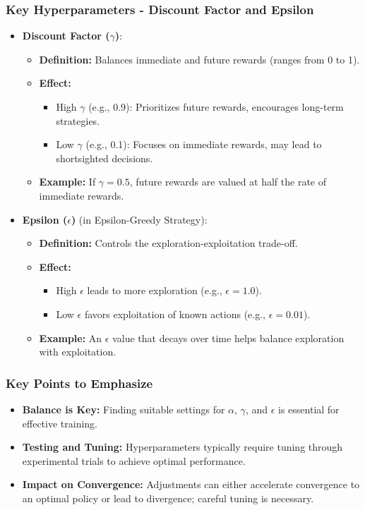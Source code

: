 \documentclass{beamer}
\begin{document}
\begin{frame}[fragile]
    \frametitle{Key Hyperparameters - Discount Factor and Epsilon}
    \begin{itemize}
        \item \textbf{Discount Factor ($\gamma$)}:
        \begin{itemize}
            \item \textbf{Definition:} Balances immediate and future rewards (ranges from 0 to 1).
            \item \textbf{Effect:}
                \begin{itemize}
                    \item High $\gamma$ (e.g., 0.9): Prioritizes future rewards, encourages long-term strategies.
                    \item Low $\gamma$ (e.g., 0.1): Focuses on immediate rewards, may lead to shortsighted decisions.
                \end{itemize}
            \item \textbf{Example:} If $\gamma = 0.5$, future rewards are valued at half the rate of immediate rewards.
        \end{itemize}

        \item \textbf{Epsilon ($\epsilon$)} (in Epsilon-Greedy Strategy):
        \begin{itemize}
            \item \textbf{Definition:} Controls the exploration-exploitation trade-off.
            \item \textbf{Effect:}
                \begin{itemize}
                    \item High $\epsilon$ leads to more exploration (e.g., $\epsilon = 1.0$).
                    \item Low $\epsilon$ favors exploitation of known actions (e.g., $\epsilon = 0.01$).
                \end{itemize}
            \item \textbf{Example:} An $\epsilon$ value that decays over time helps balance exploration with exploitation.
        \end{itemize}
    \end{itemize}
\end{frame}

\begin{frame}[fragile]
    \frametitle{Key Points to Emphasize}
    \begin{itemize}
        \item \textbf{Balance is Key:} Finding suitable settings for $\alpha$, $\gamma$, and $\epsilon$ is essential for effective training.
        \item \textbf{Testing and Tuning:} Hyperparameters typically require tuning through experimental trials to achieve optimal performance.
        \item \textbf{Impact on Convergence:} Adjustments can either accelerate convergence to an optimal policy or lead to divergence; careful tuning is necessary.
    \end{itemize}
\end{frame}
\end{document}
